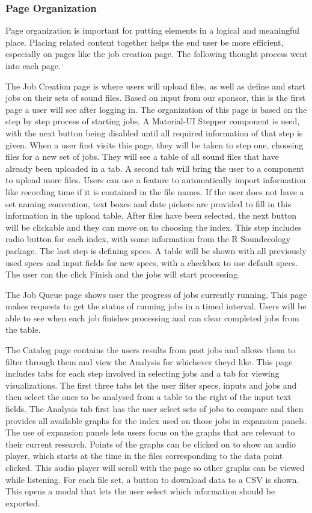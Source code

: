 \subsubsection{Page Organization}
Page organization is important for putting elements in a logical and meaningful place. Placing related content together helps the end user be more efficient, especially on pages like the job creation page. The following thought process went into each page.\par
The Job Creation page is where users will upload files, as well as define and start jobs on their sets of sound files. Based on input from our sponsor, this is the first page a user will see after logging in. The organization of this page is based on the step by step process of starting jobs. A Material-UI Stepper component is used, with the next button being disabled until all required information of that step is given. When a user first visits this page, they will be taken to step one, choosing files for a new set of jobs. They will see a table of all sound files that have already been uploaded in a tab. A second tab will bring the user to a component to upload more files. Users can use a feature to automatically import information like recording time if it is contained in the file names. If the user does not have a set naming convention, text boxes and date pickers are provided to fill in this information in the upload table. After files have been selected, the next button will be clickable and they can move on to choosing the index. This step includes radio button for each index, with some information from the R Soundecology package. The last step is defining specs. A table will be shown with all previously used specs and input fields for new specs, with a checkbox to use default specs. The user can the click Finish and the jobs will start processing.\par
The Job Queue page shows user the progress of jobs currently running. This page makes requests to get the status of running jobs in a timed interval. Users will be able to see when each job finishes processing and can clear completed jobs from the table.\par 
The Catalog page contains the user\textquotesingle s results from past jobs and allows them to filter through them and view the Analysis for whichever they\textquotesingle d like. This page includes tabs for each step involved in selecting jobs and a tab for viewing visualizations. The first three tabs let the user filter specs, inputs and jobs and then select the ones to be analysed from a table to the right of the input text fields. The Analysis tab first has the user select sets of jobs to compare and then provides all available graphs for the index used on those jobs in expansion panels. The use of expansion panels lets users focus on the graphs that are relevant to their current research. Points of the graphs can be clicked on to show an audio player, which starts at the time in the files corresponding to the data point clicked. This audio player will scroll with the page so other graphs can be viewed while listening. For each file set, a button to download data to a CSV is shown. This opens a modal that lets the user select which information should be exported.\par

